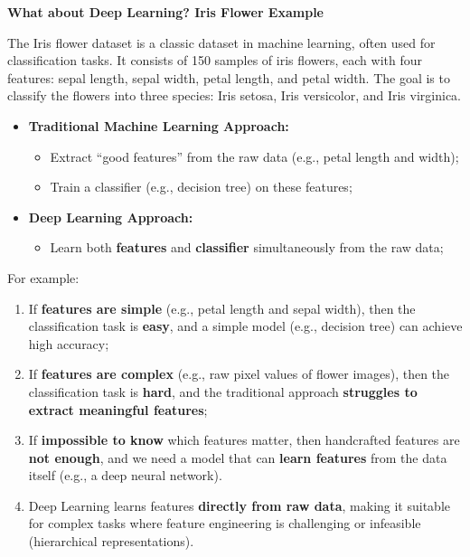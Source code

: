 \highspace
\begin{flushleft}
    \textcolor{Green3}{ \textbf{What about Deep Learning? Iris Flower Example}}
\end{flushleft}
The Iris flower dataset is a classic dataset in machine learning, often used for classification tasks. It consists of 150 samples of iris flowers, each with four features: sepal length, sepal width, petal length, and petal width. The goal is to classify the flowers into three species: Iris setosa, Iris versicolor, and Iris virginica.
\begin{itemize}
    \item \textbf{Traditional Machine Learning Approach:}
    \begin{itemize}
        \item Extract ``good features'' from the raw data (e.g., petal length and width);
        \item Train a classifier (e.g., decision tree) on these features;
    \end{itemize}
    \item \textbf{Deep Learning Approach:}
    \begin{itemize}
        \item Learn both \textbf{features} and \textbf{classifier} simultaneously from the raw data;
    \end{itemize}
\end{itemize}
For example:
\begin{enumerate}
    \item If \textbf{features are simple} (e.g., petal length and sepal width), then the classification task is \textbf{easy}, and a simple model (e.g., decision tree) can achieve high accuracy;
    \item If \textbf{features are complex} (e.g., raw pixel values of flower images), then the classification task is \textbf{hard}, and the traditional approach \textbf{struggles to extract meaningful features};
    \item If \textbf{impossible to know} which features matter, then handcrafted features are \textbf{not enough}, and we need a model that can \textbf{learn features} from the data itself (e.g., a deep neural network).
    \item Deep Learning learns features \textbf{directly from raw data}, making it suitable for complex tasks where feature engineering is challenging or infeasible (hierarchical representations).
\end{enumerate}

